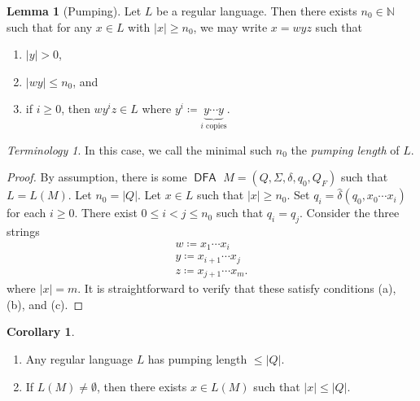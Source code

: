 \documentclass[10pt,letterpaper,cm]{nupset}
\theoremstyle{definition}
\theoremstyle{theorem}
\newtheorem{lemma}[definition]{Lemma}
\newtheorem{corollary}[definition]{Corollary}
\theoremstyle{remark}
\newtheorem*{term}{Terminology}
\newcommand{\N}{\mathbb N}
\newcommand{\1}{\mathbf{1}}
\newcommand{\0}{\vec 0}
\DeclareMathOperator{\DFA}{\mathsf{DFA}}
\begin{document}
\begin{lemma}[Pumping] Let $L$ be a regular language. Then there exists $n_0 \in \N$ such that for any $x\in L$ with $\left\lvert{x}\right\rvert\geq n_0$, we may write $x=wyz$ such that
\begin{enumerate}[label=(\alph*)]
\item $\left\lvert{y}\right\rvert >0$,
\item $\left\lvert{wy}\right\rvert\leq n_0$, and
\item if $i\geq 0$, then $wy^iz \in L$ where $y^i \coloneqq \underbrace{y\cdots y}_{i \text{ copies}}$.
\end{enumerate}
\end{lemma}
\begin{term}
In this case, we call the minimal such $n_0$ the \textit{pumping length} of $L$.
\end{term}
\begin{proof}
By assumption, there is some $\DFA$ $M = \left(Q, \Sigma, \delta, q_0, Q_F\right)$ such that $L = L(M)$. Let $n_0 = \left\lvert{Q}\right\rvert$. Let $x\in L$ such that $\left\lvert{x}\right\rvert\geq n_0$. Set $q_i = \hat{\delta}(q_0, x_0 \cdots x_i)$ for each $i\geq 0$.  There exist $0\leq i<j \leq n_0$ such that $q_i = q_j$. Consider the three strings 
\begin{gather*}
w\coloneqq x_1\cdots x_i 
\\  y\coloneqq  x_{i+1}\cdots x_j 
\\  z\coloneqq x_{j+1} \cdots x_m.
\end{gather*}
where $\left\lvert{x}\right\rvert = m$. It is straightforward to verify that these satisfy conditions (a), (b), and (c).
\end{proof}
\pagebreak
\begin{corollary} $ $
\begin{enumerate} 
\item Any regular language $L$ has pumping length $\leq \left\lvert{Q}\right\rvert$.
\item If $L(M) \ne \emptyset$, then there exists $x\in L(M)$ such that $\left\lvert{x}\right\rvert \leq \left\lvert{Q}\right\rvert$.
\end{enumerate}
\end{corollary}
\end{document}
